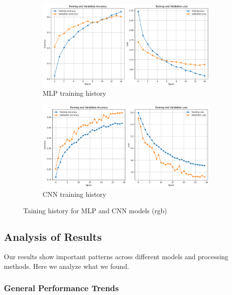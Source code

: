 \documentclass{article}
\begin{document}
\begin{figure}[H]
    \centering
    \begin{subfigure}[b]{0.48\textwidth}
        \includegraphics[width=\textwidth]{assets/confusion_matrix/rgb/MLP_history.png}
        \caption{MLP training history}
    \end{subfigure}
    \hfill
    \begin{subfigure}[b]{0.48\textwidth}
        \includegraphics[width=\textwidth]{assets/confusion_matrix/rgb/CNN_history.png}
        \caption{CNN training history}
    \end{subfigure}
    \caption{Taining history for MLP and CNN models (rgb)}
    \label{fig:rgb_training_history}
\end{figure}
\newpage
\subsection{Analysis of Results}

Our results show important patterns across different models and processing methods. Here we analyze what we found.

\subsubsection{General Performance Trends}
\end{document}

